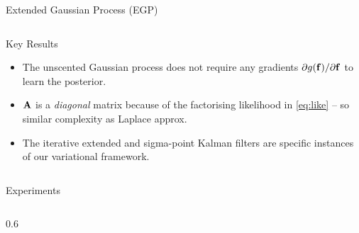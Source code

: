 \documentclass[final]{beamer}
\newlength{\onecolwid}
\newlength{\twocolwid}
\begin{document}
\begin{frame}[t]
\begin{columns}[t]
\begin{column}{\twocolwid}
\begin{columns}[t,totalwidth=\twocolwid]
\begin{column}{\onecolwid}
\begin{block}{Extended Gaussian Process (EGP)}
\end{block}




\end{column} %

\end{columns} %


\begin{alertblock}{Key Results}

\begin{itemize}

    \item The unscented Gaussian process does not require any gradients
        $\partial g\!\left({{\mathbf{f}}}\right)\!/\partial\mathbf{f}$ to learn the posterior.

    \item $\mathbf{A}$ is a \emph{diagonal} matrix because of the factorising
        likelihood in \eqref{eq:like} -- so similar complexity as Laplace
        approx.

    \item %
        The iterative extended and sigma-point Kalman filters are specific instances of 
        our variational framework.
\end{itemize}

\end{alertblock} 


\vspace{-1.5cm}


\begin{columns}[t,totalwidth=\twocolwid] %
%
%
%
\begin{column}{\twocolwid}
%
%
\begin{block}{Experiments}
%
\begin{columns}
\begin{column}{0.6\twocolwid}%


\end{column}
\end{columns}
\end{block}
\end{column}
\end{columns}
\end{column}
\end{columns}
\end{frame}
\end{document}
